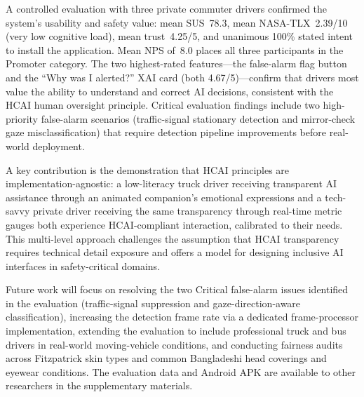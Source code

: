\documentclass[sigconf]{acmart}
\begin{document}
A controlled evaluation with three private commuter drivers confirmed the system's usability and safety value: mean SUS~78.3, mean NASA-TLX~2.39/10 (very low cognitive load), mean trust~4.25/5, and unanimous 100\% stated intent to install the application. Mean NPS of~8.0 places all three participants in the Promoter category. The two highest-rated features---the false-alarm flag button and the ``Why was I alerted?'' XAI card (both 4.67/5)---confirm that drivers most value the ability to understand and correct AI decisions, consistent with the HCAI human oversight principle. Critical evaluation findings include two high-priority false-alarm scenarios (traffic-signal stationary detection and mirror-check gaze misclassification) that require detection pipeline improvements before real-world deployment.

A key contribution is the demonstration that HCAI principles are implementation-agnostic: a low-literacy truck driver receiving transparent AI assistance through an animated companion's emotional expressions and a tech-savvy private driver receiving the same transparency through real-time metric gauges both experience HCAI-compliant interaction, calibrated to their needs. This multi-level approach challenges the assumption that HCAI transparency requires technical detail exposure and offers a model for designing inclusive AI interfaces in safety-critical domains.

Future work will focus on resolving the two Critical false-alarm issues identified in the evaluation (traffic-signal suppression and gaze-direction-aware classification), increasing the detection frame rate via a dedicated frame-processor implementation, extending the evaluation to include professional truck and bus drivers in real-world moving-vehicle conditions, and conducting fairness audits across Fitzpatrick skin types and common Bangladeshi head coverings and eyewear conditions. The evaluation data and Android APK are available to other researchers in the supplementary materials.



\end{document}
